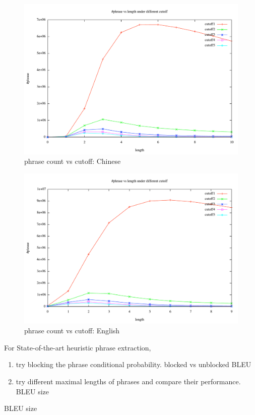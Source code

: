\documentclass[11pt, letterpaper]{article}   	%
\begin{document}
\begin{figure}[p]
\centering
\includegraphics[width=1.0\textwidth]{phrase-count-chinese.pdf}
\caption{phrase count vs cutoff: Chinese}
\label{fig:phrase-count-chinese}
\end{figure}

\begin{figure}[p]
\centering
\includegraphics[width=1.0\textwidth]{phrase-count-english.pdf}
\caption{phrase count vs cutoff: English}
\label{fig:phrase-count-english}
\end{figure}

For State-of-the-art heuristic phrase extraction, 
\begin{enumerate}
\item try blocking the phrase conditional probability.
blocked vs unblocked
BLEU
\item try different maximal lengths of phrases and compare their performance.
BLEU   size
\end{enumerate}

BLEU size



\end{document}
